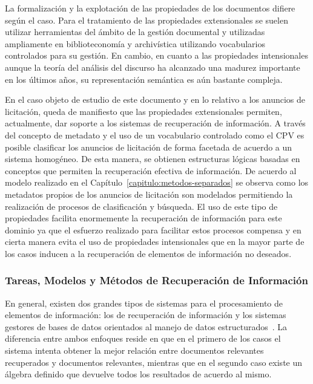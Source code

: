 La formalización y la explotación de las propiedades de los documentos 
difiere según el caso. Para el tratamiento de las propiedades extensionales 
se suelen utilizar herramientas del ámbito de la gestión documental y utilizadas 
ampliamente en biblioteconomía y archivística utilizando vocabularios 
controlados para su gestión. En cambio, en cuanto a las propiedades 
intensionales aunque la teoría del análisis del discurso ha alcanzado una madurez importante en los últimos años, 
su representación semántica es aún bastante compleja.

En el caso objeto de estudio de este documento y en lo relativo a los anuncios 
de licitación, queda de manifiesto que las propiedades extensionales permiten, actualmente, dar soporte a los sistemas de recuperación de información. A través 
del concepto de metadato y el uso de un vocabulario controlado como el \gls{CPV} 
es posible clasificar los anuncios de licitación de forma facetada 
de acuerdo a un sistema homogéneo. De esta manera, se obtienen estructuras 
lógicas basadas en conceptos que permiten la recuperación efectiva 
de información. De acuerdo al modelo realizado en el Capítulo~\ref{capitulo:metodos-separados} se observa 
como los metadatos propios de los anuncios de licitación son modelados permitiendo la realización de 
procesos de clasificación y búsqueda. El uso de este tipo de propiedades facilita enormemente 
la recuperación de información para este dominio ya que el esfuerzo realizado 
para facilitar estos procesos compensa y en cierta manera evita el uso de 
propiedades intensionales que en la mayor parte de los casos inducen 
a la recuperación de elementos de información no deseados.

\subsubsection{Tareas, Modelos y Métodos de Recuperación de Información}
En general, existen dos grandes tipos de sistemas para el procesamiento 
de elementos de información: los de recuperación de información 
y los sistemas gestores de bases de datos orientados al manejo 
de datos estructurados~\cite{Chen:1976:EMU:320434.320440}. La diferencia 
entre ambos enfoques reside en que en el primero de los casos el sistema 
intenta obtener la mejor relación entre documentos relevantes recuperados 
y documentos relevantes, mientras que en el segundo caso existe un álgebra 
definido que devuelve todos los resultados de acuerdo al mismo.

